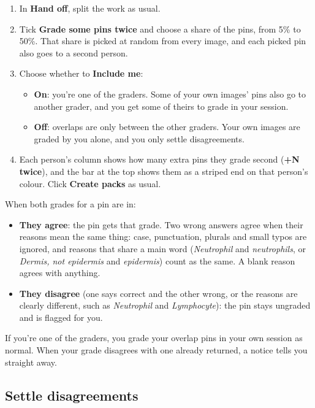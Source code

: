 \begin{enumerate}[topsep=2pt, itemsep=2pt]
\item In \textbf{Hand off}, split the work as usual.
\item Tick \textbf{Grade some pins twice} and choose a share of the pins, from 5\% to 50\%. That share is picked at random from every image, and each picked pin also goes to a second person.
\item Choose whether to \textbf{Include me}:
\begin{itemize}[topsep=1pt]
\item \textbf{On}: you're one of the graders. Some of your own images' pins also go to another grader, and you get some of theirs to grade in your session.
\item \textbf{Off}: overlaps are only between the other graders. Your own images are graded by you alone, and you only settle disagreements.
\end{itemize}
\item Each person's column shows how many extra pins they grade second (\textbf{+N twice}), and the bar at the top shows them as a striped end on that person's colour. Click \textbf{Create packs} as usual.
\end{enumerate}

When both grades for a pin are in:

\begin{itemize}[topsep=2pt, itemsep=2pt]
\item \textbf{They agree}: the pin gets that grade. Two wrong answers agree when their reasons mean the same thing: case, punctuation, plurals and small typos are ignored, and reasons that share a main word (\emph{Neutrophil} and \emph{neutrophils}, or \emph{Dermis, not epidermis} and \emph{epidermis}) count as the same. A blank reason agrees with anything.
\item \textbf{They disagree} (one says correct and the other wrong, or the reasons are clearly different, such as \emph{Neutrophil} and \emph{Lymphocyte}): the pin stays ungraded and is flagged for you.
\end{itemize}

If you're one of the graders, you grade your overlap pins in your own session as normal. When your grade disagrees with one already returned, a notice tells you straight away.

\subsection{Settle disagreements}\label{sec:handoff:settle-disagreements}

